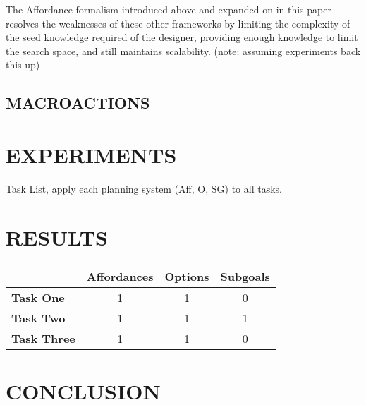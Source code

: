 \documentclass[]{article}
\begin{document}
The Affordance formalism introduced above and expanded on in this paper resolves the weaknesses of these other frameworks by limiting the complexity of the seed knowledge required of the designer, providing enough knowledge to limit the search space, and still maintains scalability. (note: assuming experiments back this up)

\subsection{MACROACTIONS}

\section{EXPERIMENTS}

Task List, apply each planning system (Aff, O, SG) to all tasks.

\section{RESULTS}

\begin{tabular}{ l || c | c | c }
  & Affordances & Options & Subgoals \\
  \hline
  {\bf Task One} & 1 & 1 & 0 \\
  {\bf Task Two} & 1 & 1 & 1 \\
  {\bf Task Three} & 1 & 1 & 0 \\
\end{tabular}


\section{CONCLUSION}


  
\end{document}
